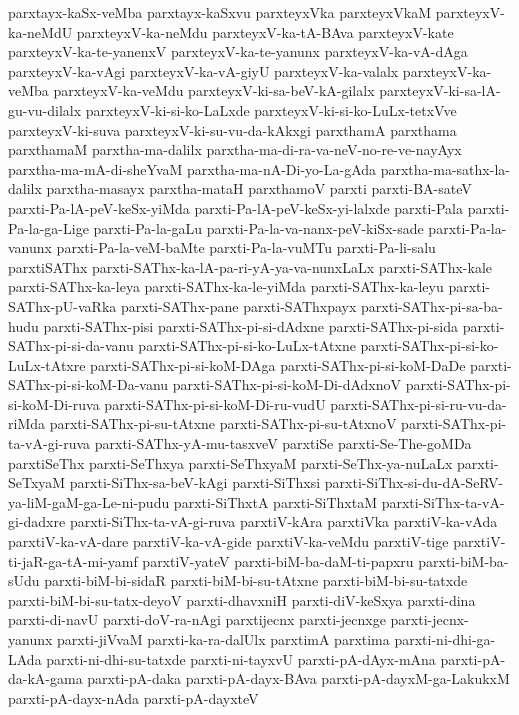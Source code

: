 {parxtayx-kaSx-veMba
parxtayx-kaSxvu
parxteyxVka
parxteyxVkaM
parxteyxV-ka-neMdU
parxteyxV-ka-neMdu
parxteyxV-ka-tA-BAva
parxteyxV-kate
parxteyxV-ka-te-yanenxV
parxteyxV-ka-te-yanunx
parxteyxV-ka-vA-dAga
parxteyxV-ka-vAgi
parxteyxV-ka-vA-giyU
parxteyxV-ka-valalx
parxteyxV-ka-veMba
parxteyxV-ka-veMdu
parxteyxV-ki-sa-beV-kA-gilalx
parxteyxV-ki-sa-lA-gu-vu-dilalx
parxteyxV-ki-si-ko-LaLxde
parxteyxV-ki-si-ko-LuLx-tetxVve
parxteyxV-ki-suva
parxteyxV-ki-su-vu-da-kAkxgi
parxthamA
parxthama
parxthamaM
parxtha-ma-dalilx
parxtha-ma-di-ra-va-neV-no-re-ve-nayAyx
parxtha-ma-mA-di-sheYvaM
parxtha-ma-nA-Di-yo-La-gAda
parxtha-ma-sathx-la-dalilx
parxtha-masayx
parxtha-mataH
parxthamoV
parxti
parxti-BA-sateV
parxti-Pa-lA-peV-keSx-yiMda
parxti-Pa-lA-peV-keSx-yi-lalxde
parxti-Pala
parxti-Pa-la-ga-Lige
parxti-Pa-la-gaLu
parxti-Pa-la-va-nanx-peV-kiSx-sade
parxti-Pa-la-vanunx
parxti-Pa-la-veM-baMte
parxti-Pa-la-vuMTu
parxti-Pa-li-salu
parxtiSAThx
parxti-SAThx-ka-lA-pa-ri-yA-ya-va-nunxLaLx
parxti-SAThx-kale
parxti-SAThx-ka-leya
parxti-SAThx-ka-le-yiMda
parxti-SAThx-ka-leyu
parxti-SAThx-pU-vaRka
parxti-SAThx-pane
parxti-SAThxpayx
parxti-SAThx-pi-sa-ba-hudu
parxti-SAThx-pisi
parxti-SAThx-pi-si-dAdxne
parxti-SAThx-pi-sida
parxti-SAThx-pi-si-da-vanu
parxti-SAThx-pi-si-ko-LuLx-tAtxne
parxti-SAThx-pi-si-ko-LuLx-tAtxre
parxti-SAThx-pi-si-koM-DAga
parxti-SAThx-pi-si-koM-DaDe
parxti-SAThx-pi-si-koM-Da-vanu
parxti-SAThx-pi-si-koM-Di-dAdxnoV
parxti-SAThx-pi-si-koM-Di-ruva
parxti-SAThx-pi-si-koM-Di-ru-vudU
parxti-SAThx-pi-si-ru-vu-da-riMda
parxti-SAThx-pi-su-tAtxne
parxti-SAThx-pi-su-tAtxnoV
parxti-SAThx-pi-ta-vA-gi-ruva
parxti-SAThx-yA-mu-tasxveV
parxtiSe
parxti-Se-The-goMDa
parxtiSeThx
parxti-SeThxya
parxti-SeThxyaM
parxti-SeThx-ya-nuLaLx
parxti-SeTxyaM
parxti-SiThx-sa-beV-kAgi
parxti-SiThxsi
parxti-SiThx-si-du-dA-SeRV-ya-liM-gaM-ga-Le-ni-pudu
parxti-SiThxtA
parxti-SiThxtaM
parxti-SiThx-ta-vA-gi-dadxre
parxti-SiThx-ta-vA-gi-ruva
parxtiV-kAra
parxtiVka
parxtiV-ka-vAda
parxtiV-ka-vA-dare
parxtiV-ka-vA-gide
parxtiV-ka-veMdu
parxtiV-tige
parxtiV-ti-jaR-ga-tA-mi-yamf
parxtiV-yateV
parxti-biM-ba-daM-ti-papxru
parxti-biM-ba-sUdu
parxti-biM-bi-sidaR
parxti-biM-bi-su-tAtxne
parxti-biM-bi-su-tatxde
parxti-biM-bi-su-tatx-deyoV
parxti-dhavxniH
parxti-diV-keSxya
parxti-dina
parxti-di-navU
parxti-doV-ra-nAgi
parxtijecnx
parxti-jecnxge
parxti-jecnx-yanunx
parxti-jiVvaM
parxti-ka-ra-dalUlx
parxtimA
parxtima
parxti-ni-dhi-ga-LAda
parxti-ni-dhi-su-tatxde
parxti-ni-tayxvU
parxti-pA-dAyx-mAna
parxti-pA-da-kA-gama
parxti-pA-daka
parxti-pA-dayx-BAva
parxti-pA-dayxM-ga-LakukxM
parxti-pA-dayx-nAda
parxti-pA-dayxteV
}
